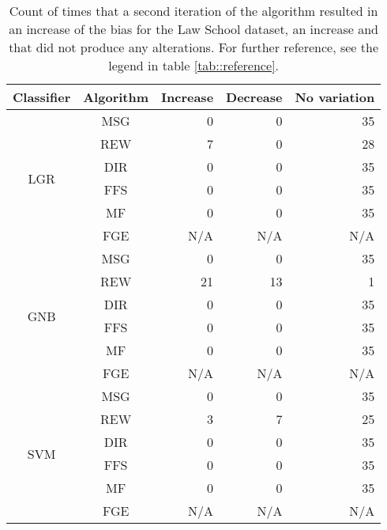 \begin{table}[htbp]
    \begin{center}
        \caption{Count of times that a second iteration of the algorithm resulted in an increase of the bias for the Law School dataset, an increase and that did not produce any alterations. For further reference, see the legend in table \ref{tab::reference}.}
        \label{tab::law_school::admission::multiple_iterations}
            \begin{tabular}{|c|c|r|r|r|}
                \hline
                \multirow{1}{*}{Classifier} & \multirow{1}{*}{Algorithm} & \multicolumn{1}{c|}{Increase} & \multicolumn{1}{c|}{Decrease} & \multicolumn{1}{c|}{No variation} \\
                \hline

                \multirow{6}{*}{LGR} & MSG & 0 & 0 & 35 \\
                \cline{2-5}
                    & REW & 7 & 0 & 28 \\
                \cline{2-5}
                    & DIR & 0 & 0 & 35 \\
                \cline{2-5}
                    & FFS &  0 & 0 & 35 \\
                \cline{2-5}
                    & MF & 0 & 0 & 35 \\
                \cline{2-5}
                    & FGE & N/A & N/A & N/A \\
                \cline{1-5}

                \multirow{6}{*}{GNB} & MSG & 0 & 0 & 35 \\
                \cline{2-5}
                    & REW & 21 & 13 & 1 \\
                \cline{2-5}
                    & DIR & 0 & 0 & 35 \\
                \cline{2-5}
                    & FFS &  0 & 0 & 35 \\
                \cline{2-5}
                    & MF & 0 & 0 & 35 \\
                \cline{2-5}
                    & FGE & N/A & N/A & N/A \\
                \cline{1-5}

                \multirow{6}{*}{SVM} & MSG & 0 & 0 & 35 \\
                \cline{2-5}
                    & REW & 3 & 7 & 25 \\
                \cline{2-5}
                    & DIR & 0 & 0 & 35 \\
                \cline{2-5}
                    & FFS &  0 & 0 & 35 \\
                \cline{2-5}
                    & MF & 0 & 0 & 35 \\
                \cline{2-5}
                    & FGE & N/A & N/A & N/A \\
                \cline{1-5}


\end{tabular}
\end{center}
\end{table}
